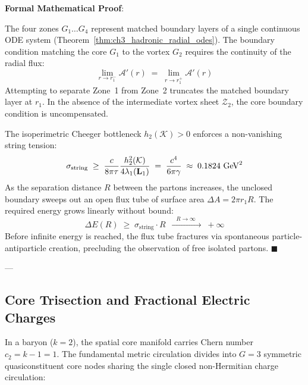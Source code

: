 \documentclass[
    12pt,
    a4paper,
    headings=normal,
    twoside=false,
    open=any,
    parskip=half
]{scrbook}
\let\hbar\relax
\newenvironment{myproof}[1][]{%
  \par\vspace{6pt}\noindent\textbf{\sffamily\color{maincolor}Formal Mathematical Proof\ifstrempty{#1}{}{ (#1)}}:\par\nopagebreak
}{%
  \penalty50\hfill\ensuremath{\blacksquare}\par\vspace{6pt}
}
\begin{document}
\begin{myproof}
The four zones $G_1 \dots G_4$ represent matched boundary layers of a single continuous ODE system (Theorem~\ref{thm:ch3_hadronic_radial_odes}). 
The boundary condition matching the core $G_1$ to the vortex $G_2$ requires the continuity of the radial flux:
\begin{equation*}
\lim_{r \to r_1^-} \mathcal{A}'(r) \;=\; \lim_{r \to r_1^+} \mathcal{A}'(r)
\end{equation*}
Attempting to separate Zone~1 from Zone~2 truncates the matched boundary layer at $r_1$. In the absence of the intermediate vortex sheet $\mathcal{Z}_2$, the core boundary condition is uncompensated. 

The isoperimetric Cheeger bottleneck $h_2(\mathcal{K}) > 0$ enforces a non-vanishing string tension:
\begin{equation*}
\sigma_{\text{string}} \;\ge\; \frac{\hbar c}{8\pi \tau} \frac{h_2^2(\mathcal{K})}{4 \lambda_1(\mathbf{L}_1)} \;=\; \frac{c^4}{6\pi \gamma} \;\approx\; 0.1824 \text{ GeV}^2
\end{equation*}
As the separation distance $R$ between the partons increases, the unclosed boundary sweeps out an open flux tube of surface area $\Delta A = 2\pi r_1 R$. 
The required energy grows linearly without bound:
\begin{equation*}
\Delta E(R) \;\ge\; \sigma_{\text{string}} \cdot R \;\xrightarrow{\quad R \to \infty \quad}\; +\infty
\end{equation*}
Before infinite energy is reached, the flux tube fractures via spontaneous particle-antiparticle creation, precluding the observation of free isolated partons.
\end{myproof}

---

\subsection{Core Trisection and Fractional Electric Charges}

In a baryon ($k = 2$), the spatial core manifold carries Chern number $c_2 = k - 1 = 1$. The fundamental metric circulation divides into $G = 3$ symmetric quasiconstituent core nodes sharing the single closed non-Hermitian charge circulation:
\end{document}
